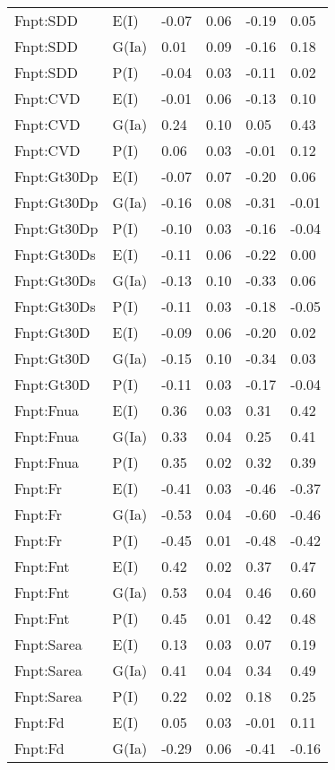 \begin{center}
\begin{longtable}{|p{1.1in}|p{0.7in}|p{0.7in}|p{0.6in}|p{0.6in}|p{0.6in}|}
  Fnpt:SDD & E(I) & -0.07 & 0.06 & -0.19 & 0.05 \\ 
  Fnpt:SDD & G(Ia) & 0.01 & 0.09 & -0.16 & 0.18 \\ 
  Fnpt:SDD & P(I) & -0.04 & 0.03 & -0.11 & 0.02 \\ 
  Fnpt:CVD & E(I) & -0.01 & 0.06 & -0.13 & 0.10 \\ 
  Fnpt:CVD & G(Ia) & 0.24 & 0.10 & 0.05 & 0.43 \\ 
  Fnpt:CVD & P(I) & 0.06 & 0.03 & -0.01 & 0.12 \\ 
  Fnpt:Gt30Dp & E(I) & -0.07 & 0.07 & -0.20 & 0.06 \\ 
  Fnpt:Gt30Dp & G(Ia) & -0.16 & 0.08 & -0.31 & -0.01 \\ 
  Fnpt:Gt30Dp & P(I) & -0.10 & 0.03 & -0.16 & -0.04 \\ 
  Fnpt:Gt30Ds & E(I) & -0.11 & 0.06 & -0.22 & 0.00 \\ 
  Fnpt:Gt30Ds & G(Ia) & -0.13 & 0.10 & -0.33 & 0.06 \\ 
  Fnpt:Gt30Ds & P(I) & -0.11 & 0.03 & -0.18 & -0.05 \\ 
  Fnpt:Gt30D & E(I) & -0.09 & 0.06 & -0.20 & 0.02 \\ 
  Fnpt:Gt30D & G(Ia) & -0.15 & 0.10 & -0.34 & 0.03 \\ 
  Fnpt:Gt30D & P(I) & -0.11 & 0.03 & -0.17 & -0.04 \\ 
  Fnpt:Fnua & E(I) & 0.36 & 0.03 & 0.31 & 0.42 \\ 
  Fnpt:Fnua & G(Ia) & 0.33 & 0.04 & 0.25 & 0.41 \\ 
  Fnpt:Fnua & P(I) & 0.35 & 0.02 & 0.32 & 0.39 \\ 
  Fnpt:Fr & E(I) & -0.41 & 0.03 & -0.46 & -0.37 \\ 
  Fnpt:Fr & G(Ia) & -0.53 & 0.04 & -0.60 & -0.46 \\ 
  Fnpt:Fr & P(I) & -0.45 & 0.01 & -0.48 & -0.42 \\ 
  Fnpt:Fnt & E(I) & 0.42 & 0.02 & 0.37 & 0.47 \\ 
  Fnpt:Fnt & G(Ia) & 0.53 & 0.04 & 0.46 & 0.60 \\ 
  Fnpt:Fnt & P(I) & 0.45 & 0.01 & 0.42 & 0.48 \\ 
  Fnpt:Sarea & E(I) & 0.13 & 0.03 & 0.07 & 0.19 \\ 
  Fnpt:Sarea & G(Ia) & 0.41 & 0.04 & 0.34 & 0.49 \\ 
  Fnpt:Sarea & P(I) & 0.22 & 0.02 & 0.18 & 0.25 \\ 
  Fnpt:Fd & E(I) & 0.05 & 0.03 & -0.01 & 0.11 \\ 
  Fnpt:Fd & G(Ia) & -0.29 & 0.06 & -0.41 & -0.16 \\ 

\end{longtable}
\end{center}
